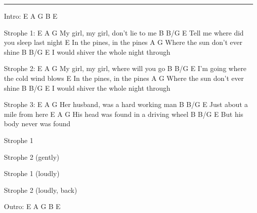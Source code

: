\noindent\rule{\columnwidth}{1pt}

\begin{multicols}{2}
\begin{lstsong}
Intro: E A G B E

Strophe 1:
E                       A      G
My girl, my girl, don't lie to me
        B                B/G     E
Tell me where did you sleep last night
E
In the pines, in the pines
          A              G
Where the sun don't ever shine
        B               B/G    E
I would shiver the whole night through

Strophe 2:
E                       A        G
My girl, my girl, where will you go
    B                B/G      E
I'm going where the cold wind blows
E
In the pines, in the pines
          A              G
Where the sun don't ever shine
        B               B/G    E
I would shiver the whole night through
\end{lstsong}
\columnbreak
\begin{lstsong}
Strophe 3:
E                  A            G
Her husband, was a hard working man
     B            B/G  E
Just about a mile from here
E                       A       G
His head was found in a driving wheel
        B         B/G  E
But his body never was found

Strophe 1

Strophe 2 (gently)

Strophe 1 (loudly)

Strophe 2 (loudly, back)

Outro: E A G B E
\end{lstsong}
\end{multicols}
\newpage

